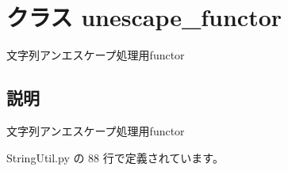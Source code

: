 \section{クラス unescape\_\-functor}
\label{classsource__py_1_1_string_util_1_1unescape__functor}
文字列アンエスケープ処理用functor  




\subsection{説明}
文字列アンエスケープ処理用functor 

 StringUtil.py の 88 行で定義されています。